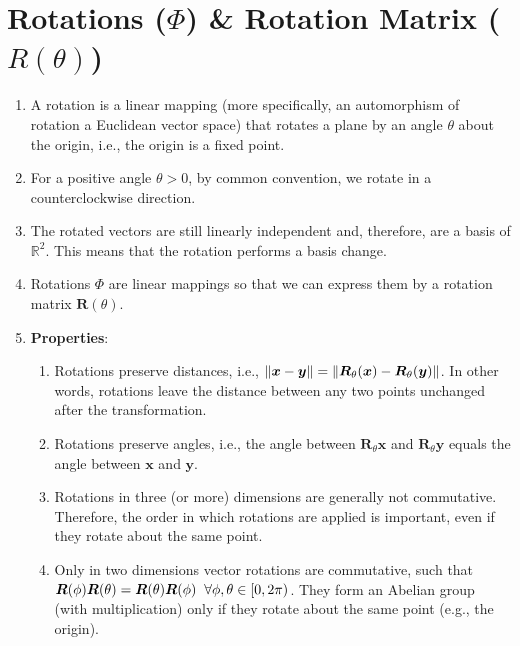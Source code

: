 \section{Rotations ($\Phi$) \& Rotation Matrix ($R(\theta)$)}



\begin{enumerate}
    \item A rotation is a linear mapping (more specifically, an automorphism of rotation a Euclidean vector space) that rotates a plane by an angle $\theta$ about the origin, i.e., the origin is a fixed point.
    \hfill \cite{mfml/book/mml/Deisenroth-Faisal-Ong}
    
    \item For a positive angle $\theta > 0$, by common convention, we rotate in a counterclockwise direction.
    \hfill \cite{mfml/book/mml/Deisenroth-Faisal-Ong}

    \item The rotated vectors are still linearly independent and, therefore, are a basis of $\mathbb{R}^2$. 
    This means that the rotation performs a basis change.
    \hfill \cite{mfml/book/mml/Deisenroth-Faisal-Ong}

    \item Rotations $\Phi$ are linear mappings so that we can express them by a rotation matrix $\bm{R}(\theta)$. 
    \hfill \cite{mfml/book/mml/Deisenroth-Faisal-Ong}

    \item \textbf{Properties}:
    \begin{enumerate}
        \item Rotations preserve distances, i.e., $\left\| \bm{x}-\bm{y} \right\| = \left\| \bm{R}_\theta (\bm{x}) - \bm{R}_\theta (\bm{y}) \right\|$. In other words, rotations leave the distance between any two points unchanged after the transformation.
        \hfill \cite{mfml/book/mml/Deisenroth-Faisal-Ong}

        \item Rotations preserve angles, i.e., the angle between $\bm{R}_\theta \bm{x}$ and $\bm{R}_\theta \bm{y}$ equals the angle between $\bm{x}$ and $\bm{y}$.
        \hfill \cite{mfml/book/mml/Deisenroth-Faisal-Ong}

        \item Rotations in three (or more) dimensions are generally not commutative. 
        Therefore, the order in which rotations are applied is important, even if they rotate about the same point. 
        \hfill \cite{mfml/book/mml/Deisenroth-Faisal-Ong}
        
        \item Only in two dimensions vector rotations are commutative, such that $\bm{R}(\phi)\bm{R}(\theta ) = \bm{R}(\theta )\bm{R}(\phi) \hspace{0.2cm} \forall \phi, \theta  \in [0, 2\pi)$. 
        They form an Abelian group (with multiplication) only if they rotate about the same point (e.g., the origin).
        \hfill \cite{mfml/book/mml/Deisenroth-Faisal-Ong}
    \end{enumerate}
\end{enumerate}


